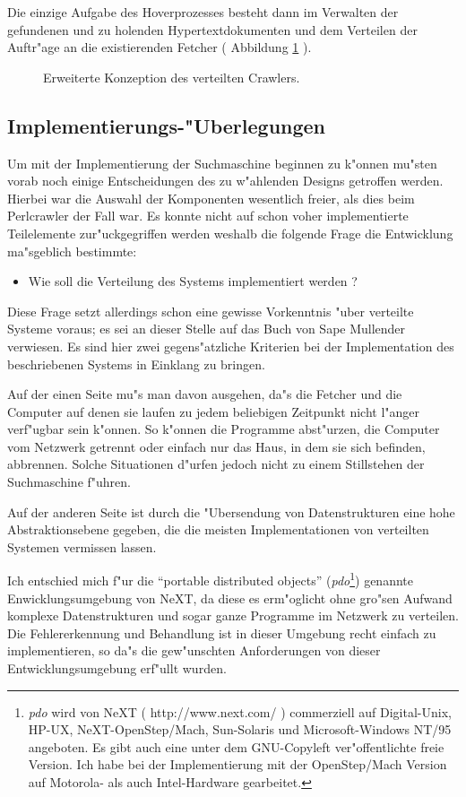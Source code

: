 Die einzige Aufgabe des Hoverprozesses besteht dann im Verwalten der gefundenen und zu holenden Hypertextdokumenten und dem Verteilen der Auftr"age an die existierenden Fetcher ( Abbildung \ref{HooverZweiterUeberblick} ).

\begin{figure}[t]
	\caption{Erweiterte Konzeption des verteilten Crawlers.}
	\label{HooverZweiterUeberblick}
\end{figure}

\subsection{Implementierungs-"Uberlegungen}
Um mit der Implementierung der Suchmaschine beginnen zu k"onnen mu"sten vorab noch einige Entscheidungen des zu w"ahlenden Designs getroffen werden. Hierbei war die Auswahl der Komponenten wesentlich freier, als dies beim Perlcrawler der Fall war. Es konnte nicht auf schon voher implementierte Teilelemente zur"uckgegriffen werden weshalb die folgende Frage die Entwicklung ma"sgeblich bestimmte:
\begin{itemize}
	\item	Wie soll die Verteilung des Systems implementiert werden ?
\end{itemize}

Diese Frage setzt allerdings schon eine gewisse Vorkenntnis "uber verteilte Systeme voraus; es sei an dieser Stelle auf das Buch von Sape Mullender\cite{Mullender1993} verwiesen. Es sind hier zwei gegens"atzliche Kriterien bei der Implementation des beschriebenen Systems in Einklang zu bringen.

Auf der einen Seite mu"s man davon ausgehen, da"s die Fetcher und die Computer auf denen sie laufen zu jedem beliebigen Zeitpunkt nicht l"anger verf"ugbar sein k"onnen. So k"onnen die Programme abst"urzen, die Computer vom Netzwerk getrennt oder einfach nur das Haus, in dem sie sich befinden, abbrennen. Solche Situationen d"urfen jedoch nicht zu einem Stillstehen der Suchmaschine f"uhren.

Auf der anderen Seite ist durch die "Ubersendung von Datenstrukturen eine hohe Abstraktionsebene gegeben, die die meisten Implementationen von verteilten Systemen vermissen lassen.

Ich entschied mich f"ur die "`portable distributed objects"' ({\em pdo}\footnote{{\em pdo} wird von NeXT ( http://www.next.com/ ) commerziell auf Digital-Unix, HP-UX, NeXT-OpenStep/Mach, Sun-Solaris und Microsoft-Windows NT/95 angeboten. Es gibt auch eine unter dem GNU-Copyleft ver"offentlichte freie Version. Ich habe bei der Implementierung mit der OpenStep/Mach Version auf Motorola- als auch Intel-Hardware gearbeitet.}) genannte Enwicklungsumgebung von NeXT, da diese es erm"oglicht ohne gro"sen Aufwand komplexe Datenstrukturen und sogar ganze Programme im Netzwerk zu verteilen. Die Fehlererkennung und Behandlung ist in dieser Umgebung recht einfach zu implementieren, so da"s die gew"unschten Anforderungen von dieser Entwicklungsumgebung erf"ullt wurden.

